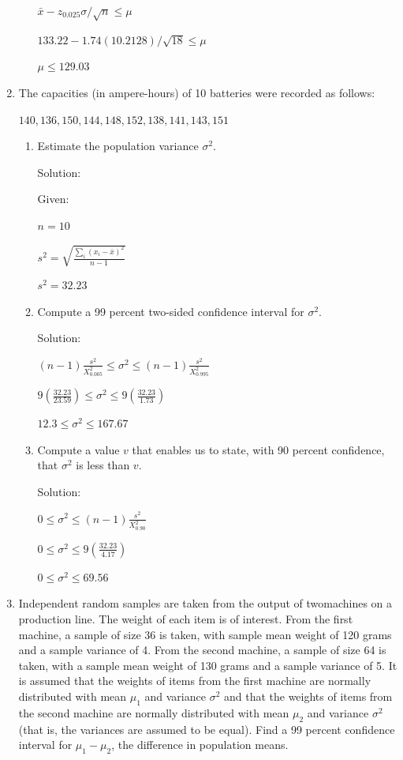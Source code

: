 \documentclass{article}
\begin{document}
\begin{enumerate}
\begin{enumerate}
        $\bar{x} - z_{0.025}\sigma/\sqrt{n} \leq \mu$

        $133.22 - 1.74(10.2128)/\sqrt{18} \leq \mu$

        $\mu \leq 129.03$

    \end{enumerate}
    \item The capacities (in ampere-hours) of 10 batteries were recorded as follows:
    
    $140, 136, 150, 144, 148, 152, 138, 141, 143, 151$

    \begin{enumerate}
        \item Estimate the population variance $\sigma^2$.
        
        Solution: 

        Given:
        
        $n = 10$

        $\displaystyle s^2=\sqrt{\frac{\sum_i{(x_i-\bar{x})^2}}{n-1}}$

        $s^2 = 32.23$

        \item Compute a 99 percent two-sided confidence interval for $\sigma^2$.
        
        Solution: 

        $(n-1)\frac{s^2}{X_{0.005}^2} \leq \sigma^2 \leq (n-1)\frac{s^2}{X_{0.995}^2}$

        $\displaystyle 9\left(\frac{32.23}{23.59}\right) \leq \sigma^2 \leq 9\left(\frac{32.23}{1.73}\right)$

        $12.3 \leq \sigma^2 \leq 167.67$

        \item Compute a value $v$ that enables us to state, with 90 percent confidence, that $\sigma^2$ is less than $v$.
        
        Solution: 

        $0 \leq \sigma^2 \leq (n-1)\frac{s^2}{X_{0.90}^2}$

        $0 \leq \sigma^2 \leq 9\left(\frac{32.23}{4.17}\right)$

        $0 \leq \sigma^2 \leq 69.56$

    \end{enumerate}
    \item Independent random samples are taken from the output of twomachines on a production line. 
    The weight of each item is of interest. From the first machine, a sample of size 36 is taken, with sample mean weight of 120 grams and a sample variance of 4.
    From the second machine, a sample of size 64 is taken, with a sample mean weight of 130 grams and a sample variance of 5.
    It is assumed that the weights of items from the first machine are normally distributed with mean $\mu_1$ and variance $\sigma^2$ and that the weights of items from the second machine are normally distributed with mean $\mu_2$ and variance $\sigma^2$ (that is, the variances are assumed to be equal). 
    Find a 99 percent confidence interval for $\mu_1 - \mu_2$, the difference in population means.
    

\end{enumerate}
\end{document}
